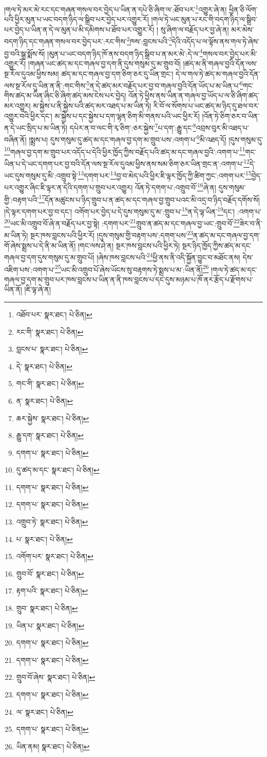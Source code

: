 །གལ་ཏེ་མར་མེ་རང་དང་གཞན་གསལ་བར་བྱེད་པ་ཡིན་ན་དཔེ་ཅི་ཞིག་ལ་:ཐོབ་པར་\footnote{འཐོབ་པར་  སྣར་ཐང་།  པེ་ཅིན། }འགྱུར་ཞེ་ན། ཕྱིན་ཅི་ལོག་པའི་ཕྱིར་མུན་པ་ཡང་བདག་ཉིད་ལ་སྒྲིབ་པར་བྱེད་པར་འགྱུར་རོ། །གལ་ཏེ་ཡང་མུན་པ་རང་གི་བདག་ཉིད་ལ་སྒྲིབ་པར་བྱེད་པ་ཡིན་ན་དེ་ལ་མུན་པ་མི་དམིགས་པ་ཐོབ་པར་འགྱུར་རོ། །
སུ་ཞིག་ལ་བརྗོད་པར་བྱ་ཞེ་ན། མར་མེས་བདག་ཉིད་དང་གཞན་གསལ་བར་བྱེད་པར་:རང་གིས་\footnote{རང་གི་  སྣར་ཐང་།  པེ་ཅིན། }ཁས་:བླངས་པའི་\footnote{བླངས་པ་  སྣར་ཐང་།  པེ་ཅིན། }དེའི་འདོད་པ་ལ་ལྟོས་ནས་གལ་ཏེ་ཞེས་བྱ་བའི་སྒྲ་སྨོས་སོ། །མུན་པ་ཡང་བདག་ཉིད་ཁོ་ནས་བདག་ཉིད་སྒྲིབ་པ་ན་མར་མེ་:དེ་ལ་\footnote{དེ་  སྣར་ཐང་།  པེ་ཅིན། }གསལ་བར་བྱེད་པར་མི་འགྱུར་རོ། །གཞན་ཡང་ཚད་མ་དང་གཞལ་བྱ་དག་ནི་དུས་གསུམ་དུ་མ་གྲུབ་བོ། །ཚད་མ་ནི་གཞལ་བྱའི་དོན་ལས་སྔ་རོལ་དུའམ་ཕྱིས་སམ། ཚད་མ་དང་གཞལ་བྱ་དག་ཅིག་ཅར་དུ་ཡིན་གྲང་། དེ་ལ་གལ་ཏེ་ཚད་མ་གཞལ་བྱའི་དོན་ལས་སྔ་རོལ་དུ་ཡིན་ན་ནི་:གང་གིས་\footnote{གང་གི་  སྣར་ཐང་།  པེ་ཅིན། }ན་དེ་ཚད་མར་བརྗོད་པར་བྱ་བ་གཞལ་བྱའི་དོན་ཡོད་པ་མ་ཡིན་པ་\footnote{ན་  སྣར་ཐང་།  པེ་ཅིན། }གང་གིས་ཚད་མ་ཡིན་ཞིང་ཅི་ཞིག་ཚད་མས་ངེས་པར་བྱེད། འོན་ཏེ་ཕྱིས་ནས་ཡིན་ན་གཞལ་བྱ་ཡོད་པ་ལ་ཅི་ཞིག་ཚད་མར་འགྱུར། མ་སྐྱེས་པ་ནི་སྐྱེས་པའི་ཚད་མར་འཐད་པ་མ་ཡིན་ཏེ། རི་བོ་ལ་སོགས་པ་ཡང་ཚད་མ་ཉིད་དུ་ཐལ་བར་འགྱུར་བའི་ཕྱིར་དང་། མ་སྐྱེས་པ་དང་སྐྱེས་པ་དག་ལྷན་ཅིག་མི་གནས་པའི་ཡང་ཕྱིར་རོ། །འོན་ཏེ་ཅིག་ཅར་བ་ཡིན་ན་དེ་ཡང་སྲིད་པ་མ་ཡིན་ཏེ། དཔེར་ན་བ་ལང་གི་རྭ་ཅིག་:ཅར་སྐྱེས་\footnote{ཆར་སྐྱེས་  སྣར་ཐང་།  པེ་ཅིན། }པ་དག་:རྒྱུ་དང་\footnote{རྒྱུ་དག་  སྣར་ཐང་།  པེ་ཅིན། }འབྲས་བུར་མི་འཐད་པ་བཞིན་ནོ། །སྨྲས་པ། དུས་གསུམ་དུ་ཚད་མ་དང་གཞལ་བྱ་དག་མ་གྲུབ་པས་:འགག་པ་\footnote{དགག་པ་  སྣར་ཐང་།  པེ་ཅིན། }མི་འཐད་དོ། །དུས་གསུམ་དུ་\footnote{དུ་ཚད་མ་དང་  སྣར་ཐང་།  པེ་ཅིན། }གཞལ་བྱ་དག་མ་གྲུབ་པར་འདོད་པ་དེའི་ཕྱིར་ཁྱོད་ཀྱིས་བརྗོད་པའི་ཚད་མ་དང་གཞལ་བྱའི་:འགག་པ་\footnote{དགག་པ་  སྣར་ཐང་།  པེ་ཅིན། }གང་ཡིན་པ་དེ་ཡང་དགག་པར་བྱ་བའི་དོན་ལས་སྔ་རོལ་དུའམ་ཕྱིས་ནས་སམ་ཅིག་ཅར་ཡིན་གྲང་ན་:འགག་པ་\footnote{དགག་པ་  སྣར་ཐང་།  པེ་ཅིན། }དེ་ཡང་དུས་གསུམ་དུ་མི་:འགྲུབ་སྟེ་\footnote{འགྲུབ་ཏེ་  སྣར་ཐང་།  པེ་ཅིན། }དགག་པར་\footnote{པ་  སྣར་ཐང་།  པེ་ཅིན། }བྱ་བ་མེད་པའི་ཕྱིར་ཇི་ལྟར་ཁྱོད་ཀྱི་ཚིག་ཀྱང་:འགག་པར་\footnote{འགོག་པར་  སྣར་ཐང་།  པེ་ཅིན། }བྱེད་པར་འགྱུར་ཞིང་ཇི་ལྟར་ན་དེའི་དགག་པ་གྲུབ་པར་འགྱུར། འོན་ཏེ་དགག་པ་:འགྲུབ་བོ་\footnote{གྲུབ་བོ་  སྣར་ཐང་།  པེ་ཅིན། }ཞེ་ན། དུས་གསུམ་གྱི་:བརྟག་པའི་\footnote{རྟག་པའི་  སྣར་ཐང་།  པེ་ཅིན། }དོན་མཚུངས་པ་ཉིད་གྲུབ་པ་ན་ཚད་མ་དང་གཞལ་བྱ་གྲུབ་པའང་མི་འདྲ་བ་ཉིད་བརྗོད་དགོས་སོ། །དེ་ལྟར་དགག་པར་བྱ་བ་དང་། འགོག་པར་བྱེད་པ་དེ་དུས་གསུམ་དུ་མ་:གྲུབ་པ་\footnote{གྲུབ་  སྣར་ཐང་།  པེ་ཅིན། }ན་དེ་ལྟ་ཡིན་\footnote{ཡིན་པ་  སྣར་ཐང་།  པེ་ཅིན། }དང་། :འགག་པ་\footnote{དགག་པ་  སྣར་ཐང་།  པེ་ཅིན། }ཡང་མི་འགྲུབ་བོ་ཞེ་ན་བརྗོད་པར་བྱ་སྟེ། :དགག་པར་\footnote{དགག་པ་  སྣར་ཐང་།  པེ་ཅིན། }གྲུབ་ན་ཚད་མ་དང་གཞལ་བྱ་ཡང་:གྲུབ་བོ་\footnote{གྲུབ་བོ་ཞེས་  སྣར་ཐང་།  པེ་ཅིན། }ཟེར་བ་ནི་མ་ཡིན་ཏེ། སྔར་ཁས་བླངས་པའི་ཕྱིར་རོ། །དུས་གསུམ་གྱི་བརྟག་པས་:དགག་པས་\footnote{དགག་པ་  སྣར་ཐང་།  པེ་ཅིན། }ན་ཚད་མ་དང་གཞལ་བྱ་དག་གོ་ཞེས་སྨྲས་པ་དེ་ནི་མ་ཡིན་ནོ། །གང་ལས་ཤེ་ན། སྔར་ཁས་བླངས་པའི་ཕྱིར་ཏེ། སྔར་ཉིད་ཁྱོད་ཀྱིས་ཚད་མ་དང་གཞལ་བྱ་དག་དུས་གསུམ་དུ་མ་གྲུབ་པོ། །ཞེས་ཁས་བླངས་པའི་\footnote{ལ་  སྣར་ཐང་།  པེ་ཅིན། }ཕྱི་ནས་ནི་འདི་སྐྱོན་བྱུང་བ་མཐོང་ནས། དེས་འཇིག་པས་:འགག་པ་\footnote{དགག་པ་  སྣར་ཐང་།  པེ་ཅིན། }ཡང་མི་འགྲུབ་པོ་ཞེས་ཡོངས་སུ་བརྟགས་ཏེ་སྨྲས་པ་མ་:ཡིན་ནོ།\footnote{ཡིན་ནམ།  སྣར་ཐང་།  པེ་ཅིན། } །གལ་ཏེ་ཚད་མ་དང་གཞལ་བྱ་དག་མ་གྲུབ་པར་ཁས་བླངས་པ་ཡིན་ན་ནི་ཁས་བླངས་པ་དང་དུས་མཉམ་པ་ཁོ་ནར་རྩོད་པ་རྫོགས་པ་ཡིན་ནོ། །ཇི་ལྟ་ཞེ་ན། 
